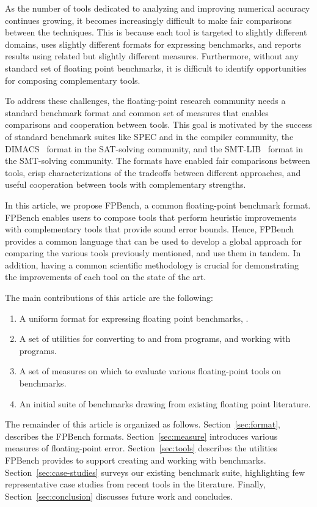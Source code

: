 \documentclass[main.tex]{subfiles}
\begin{document}
As the number of tools dedicated to analyzing and improving numerical
accuracy continues growing, it becomes increasingly difficult to make fair
comparisons between the techniques.  This is because each tool is targeted
to slightly different domains, uses slightly different formats for
expressing benchmarks, and reports results using related but slightly
different measures.  Furthermore, without any standard set of floating
point benchmarks, it is difficult to identify opportunities for composing
complementary tools.

To address these challenges, the floating-point research community needs a
standard benchmark format and common set of measures that enables
comparisons and cooperation between tools.  This goal is motivated by the
success of standard benchmark suites like SPEC and  in
the compiler community, the DIMACS~ format in the SAT-solving
community, and the SMT-LIB~ format in the SMT-solving community.
The formats have enabled fair comparisons between tools, crisp
characterizations of the tradeoffs between different approaches, and useful
cooperation between tools with complementary strengths.

In this article, we propose FPBench, a common floating-point benchmark
format. FPBench enables users to compose tools that perform heuristic
improvements with complementary tools that provide sound error bounds.
Hence, FPBench provides a common language that can be used to develop a
global approach for comparing the various tools previously mentioned, and
use them in tandem. In addition, having a common scientific methodology is
crucial for demonstrating the improvements of each tool on the state of the
art.

The main contributions of this article are the following:
\begin{enumerate}[label=(\roman*)]
%
\item A uniform format for expressing floating point benchmarks, \core.
%
\item A set of utilities for converting to and from \core programs, and
  working with \core programs.
%
\item A set of measures on which to evaluate various floating-point tools
  on \name benchmarks.
%
\item An initial suite of benchmarks drawing from existing floating point
  literature.
%
\end{enumerate}

The remainder of this article is organized as follows.
Section~\ref{sec:format}, describes the FPBench formats.
Section~\ref{sec:measure} introduces various measures of floating-point
error.  Section~\ref{sec:tools} describes the utilities FPBench provides to
support creating and working with benchmarks.
Section~\ref{sec:case-studies} surveys our existing benchmark suite,
highlighting few representative case studies from recent tools in the
literature.  Finally, Section~\ref{sec:conclusion} discusses future work
and concludes.
\end{document}
